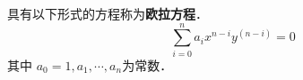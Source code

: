 
\begin{issues}
\issueDraft
\end{issues}

具有以下形式的方程称为\textbf{欧拉方程}．
\begin{equation}
\sum_{i=0}^{n}a_ix^{n-i}y^{(n-i)}=0
\end{equation}
其中 $a_0=1,a_1,\cdots,a_n$为常数．
